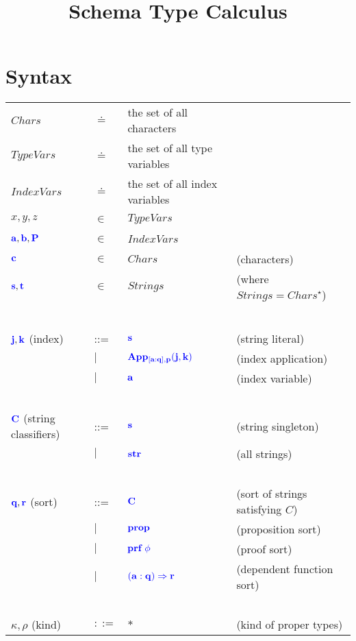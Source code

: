 \documentclass{article}
\title{Schema Type Calculus}
\newcommand{\blu}[1]{\mathbf{\color{blue}{#1}}}
\begin{document}
\maketitle

\section*{Syntax}

\begin{tabular}{llll}
$\mathit{Chars}$ & $\doteq$ & the set of all characters \\
$\mathit{TypeVars}$ & $\doteq$ & the set of all type variables \\
$\mathit{IndexVars}$ & $\doteq$ & the set of all index variables \\
$x,y,z$ & $\in$ & $\mathit{TypeVars}$ & ~ \\
$\blu{a}, \blu{b}, \blu{P}$ & $\in$ & $\mathit{IndexVars}$ & ~ \\
$\blu{c}$ & $\in$ & $\mathit{Chars}$ & (characters) \\
$\blu{s},\blu{t}$ & $\in$ & $\mathit{Strings}$ & (where $\mathit{Strings} = \mathit{Chars}^{\star}$) \\~\\
 & & \\
$\blu{j},\blu{k}$ (index) & ::=  & $\blu{s}$ & (string literal) \\
                          & $\mid$ & $\blu{App_{[a : q],p}(j,k)}$ & (index application) \\
                          & $\mid$ & $\blu{a}$ & (index variable) \\~\\
$\blu{C}$ (string classifiers) & ::= & $\blu{s}$ & (string singleton) \\
                         & $\mid$ & $\blu{str}$ & (all strings) \\~\\
$\blu{q},\blu{r}$ (sort) & ::= & $\blu{C}$ & (sort of strings satisfying $C$) \\
                         & $\mid$ & $\blu{\textbf{prop}}$ & (proposition sort) \\
                         & $\mid$ & $\blu{\textbf{prf}~\phi}$ & (proof sort) \\
                         & $\mid$ & $\blu{(a : q) \Rightarrow r}$ & (dependent function sort) \\~\\
$\kappa,\rho$ (kind) & $::=$ & $\ast$ & (kind of proper types) \\

\end{tabular}
\end{document}

